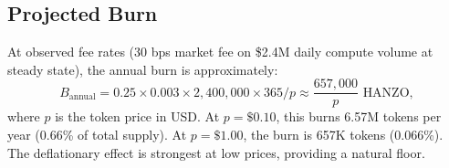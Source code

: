 \subsection{Projected Burn}

At observed fee rates (30 bps market fee on \$2.4M daily compute volume at
steady state), the annual burn is approximately:
\begin{equation}
B_{\text{annual}} = 0.25 \times 0.003 \times 2{,}400{,}000 \times 365 /
p \approx \frac{657{,}000}{p} \text{ HANZO},
\end{equation}
where $p$ is the token price in USD. At $p = \$0.10$, this burns 6.57M tokens
per year (0.66\% of total supply). At $p = \$1.00$, the burn is 657K tokens
(0.066\%). The deflationary effect is strongest at low prices, providing a
natural floor.

